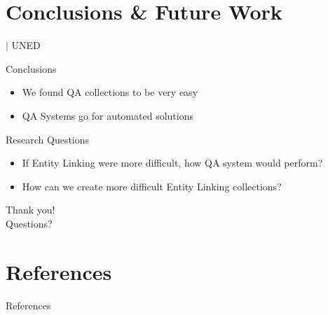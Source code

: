 \documentclass[]{beamer}
\newcommand{\mShortTitle}{\secname \hfill {\scriptsize$|$ UNED}}
\begin{document}
\section{Conclusions \& Future Work}
  \begin{frame}{\mShortTitle}
    \begin{alertblock}{Conclusions}
      \begin{itemize}
        \item We found QA collections to be very easy
        \item QA Systems go for automated solutions
      \end{itemize}
    \end{alertblock}
    \begin{alertblock}{Research Questions}
      \begin{itemize}
        \item If Entity Linking were more difficult, how QA system would perform?
        \item How can we create more difficult Entity Linking collections?
      \end{itemize}
    \end{alertblock}
  \end{frame}

  \begin{frame}[standout]
    Thank you!\\
    Questions?
  \end{frame}

\section{References}
  \begin{frame}[allowframebreaks]{References}
    \printbibliography%
  \end{frame}
\end{document}
